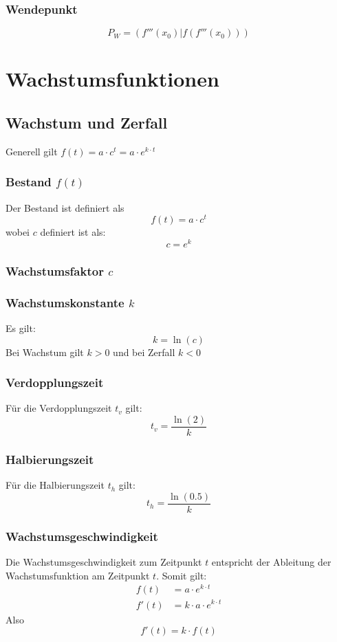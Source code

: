 \documentclass[a4paper,12pt]{article}
\begin{document}
\subsubsection{Wendepunkt}
$$P_{W} = (f'''(x_0) | f(f'''(x_0)))$$
\section{Wachstumsfunktionen}


\subsection{Wachstum und Zerfall}
Generell gilt $f(t) = a \cdot c^t = a \cdot e^{k \cdot t}$ 
\subsubsection{Bestand $f(t)$}
Der Bestand ist definiert als
$$f(t) = a \cdot c^t$$
wobei $c$ definiert ist als:
$$c = e^k$$
\subsubsection{Wachstumsfaktor $c$}
\subsubsection{Wachstumskonstante $k$}
Es gilt:
$$k = \ln{(c)}$$
Bei Wachstum gilt $k > 0$ und bei Zerfall $k < 0$
\subsubsection{Verdopplungszeit}
Für die Verdopplungszeit $t_v$ gilt:
$$t_v = \frac{\ln{(2)}}{k}$$
\subsubsection{Halbierungszeit}
Für die Halbierungszeit $t_h$ gilt:
$$t_h = \frac{\ln{(0.5)}}{k}$$
\subsubsection{Wachstumsgeschwindigkeit}
Die Wachstumsgeschwindigkeit zum Zeitpunkt $t$ entspricht der Ableitung der Wachstumsfunktion am Zeitpunkt $t$.
Somit gilt:
\begin{equation}
\begin{split}
f(t) & = a \cdot e^{k \cdot t}\\
f'(t) &= k \cdot a \cdot e^{k \cdot t}
\end{split}
\end{equation}
Also $$f'(t) = k \cdot f(t)$$
\end{document}
